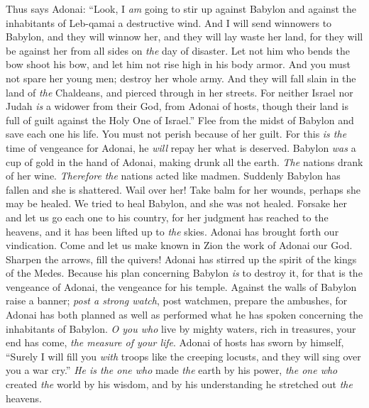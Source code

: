 \begin{biblechapter} %
\verse Thus says Adonai:
\verse “Look, I \textit{am} going to stir up against Babylon 
and against the inhabitants of Leb-qamai a destructive wind.
\verse And I will send winnowers to Babylon, 
and they will winnow her, 
and they will lay waste her land, 
for they will be against her from all sides on \textit{the} day of disaster.
\verse Let not him who bends the bow shoot his bow, 
and let him not rise high in his body armor. 
And you must not spare her young men; 
destroy her whole army.
\verse And they will fall slain in the land of \textit{the} Chaldeans, 
and pierced through in her streets.
\verse For neither Israel nor Judah \textit{is} a widower from their God, 
from Adonai of hosts, 
though their land is full of guilt 
against the Holy One of Israel.”
\verse Flee from the midst of Babylon and save each one his life. 
You must not perish because of her guilt. 
For this \textit{is the} time of vengeance for Adonai, 
he \textit{will} repay her what is deserved.
\verse Babylon \textit{was} a cup of gold in the hand of Adonai, 
making drunk all the earth. 
\textit{The} nations drank of her wine. 
\textit{Therefore} \textit{the} nations acted like madmen.
\verse Suddenly Babylon has fallen and she is shattered. 
Wail over her! 
Take balm for her wounds, 
perhaps she may be healed.
\verse We tried to heal Babylon, and she was not healed. 
Forsake her and let us go each one to his country, 
for her judgment has reached to the heavens, 
and it has been lifted up to \textit{the} skies.
\verse Adonai has brought forth our vindication. 
Come and let us make known in Zion the work of Adonai our God.
\verse Sharpen the arrows, fill the quivers! 
Adonai has stirred up the spirit of the kings of the Medes. 
Because his plan concerning Babylon \textit{is} to destroy it, 
for that is the vengeance of Adonai, 
the vengeance for his temple.
\verse Against the walls of Babylon raise a banner; 
\textit{post a strong watch}, post watchmen, prepare the ambushes, 
for Adonai has both planned as well as performed 
what he has spoken concerning the inhabitants of Babylon.
\verse \textit{O you who} live by mighty waters, rich in treasures, 
your end has come, \textit{the measure of your life}.
\verse Adonai of hosts has sworn by himself, 
“Surely I will fill you \textit{with} troops like the creeping locusts, 
and they will sing over you a war cry.”
\verse \textit{He is the one who} made \textit{the} earth by his power, 
\textit{the one who} created \textit{the} world by his wisdom, 
and by his understanding he stretched out \textit{the} heavens.

\end{biblechapter}
